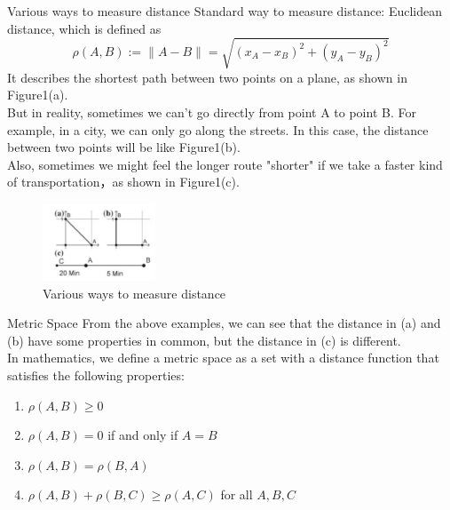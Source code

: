 \documentclass[xcolor=dvipsnames]{beamer}
\theoremstyle{remark}
\begin{document}
\begin{frame}{Various ways to measure distance}
  \hspace*{1em}Standard way to measure distance: Euclidean distance, which is defined as
$$
\rho(A, B) := \|A - B\| = \sqrt{(x_A - x_B)^2 + (y_A - y_B)^2}
$$
\hspace*{1em}It describes the shortest path between two points on a plane, as shown in Figure1(a).\\
\hspace*{1em}But in reality, sometimes we can't go directly from point A to point B. For example, in a city, we can only go along the streets. In this case, the distance between two points will be like Figure1(b).\\
\hspace*{1em}Also, sometimes we might feel the longer route "shorter" if we take a faster kind of transportation，as shown in Figure1(c).


  \begin{figure}[H] %
      \centering       %
      \includegraphics[width=0.3\textwidth]{fig1.png} %
      \caption{Various ways to measure distance} %
      \label{Fig1}   %
  \end{figure}

\end{frame}
\begin{frame}{Metric Space}
  \hspace*{1em}From the above examples, we can see that the distance in (a) and (b) have some properties in common, but the distance in (c) is different.\\
  \hspace*{1em}In mathematics, we define a metric space as a set with a distance function that satisfies the following properties:
  \begin{enumerate}[label=\roman*.]
    \item $\rho(A, B) \geq 0$
    \item $\rho(A, B) = 0$ if and only if $A = B$
    \item $\rho(A, B) = \rho(B, A)$
    \item $\rho(A, B) + \rho(B, C) \geq \rho(A, C)$ for all $A, B, C$
  \end{enumerate}
\end{frame}
\end{document}
